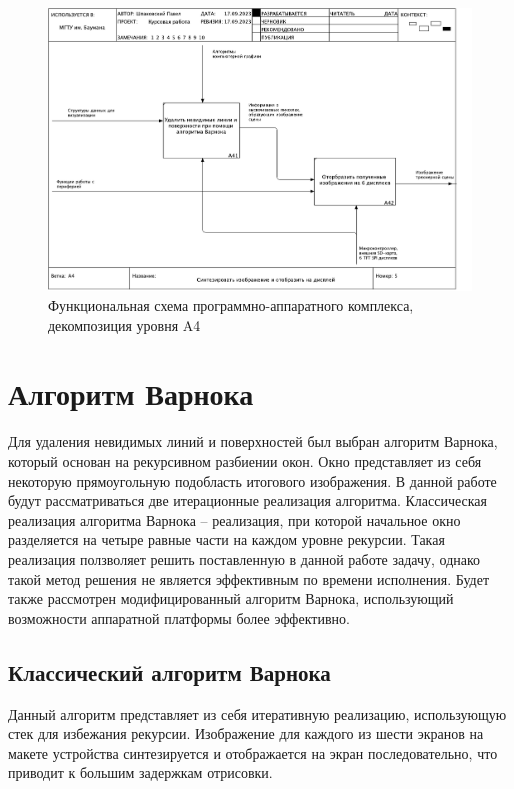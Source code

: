 \begin{figure}[H]
	\centering
	\includegraphics[height=0.45\textheight]{inc/img/05_A4.pdf}
	\caption{Функциональная схема программно-аппаратного комплекса, декомпозиция уровня A4}
	\label{fig:a4}
\end{figure}

\section{Алгоритм Варнока}
Для удаления невидимых линий и поверхностей был выбран алгоритм Варнока, который основан на рекурсивном разбиении окон. 
Окно представляет из себя некоторую прямоугольную подобласть итогового изображения.
В данной работе будут рассматриваться две итерационные реализация алгоритма. Классическая реализация алгоритма Варнока -- реализация, при которой начальное окно разделяется на четыре равные части на каждом уровне рекурсии. Такая реализация ползволяет решить поставленную в данной работе задачу, однако такой метод решения не является эффективным по времени исполнения. Будет также рассмотрен модифицированный алгоритм Варнока, использующий возможности аппаратной платформы более эффективно. 

\subsection{Классический алгоритм Варнока}
Данный алгоритм представляет из себя итеративную реализацию, использующую стек для избежания рекурсии. Изображение для каждого из шести экранов на макете устройства синтезируется и отображается на экран последовательно, что приводит к большим задержкам отрисовки. 

